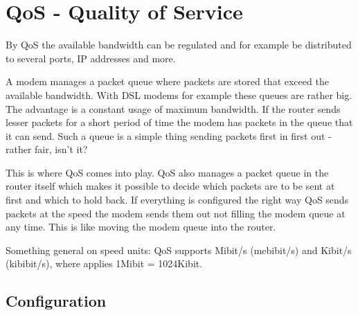 \section{QoS - Quality of Service}

   By QoS the available bandwidth can be regulated and for
   example be distributed to several ports, IP addresses and more.

   A modem manages a packet queue where packets are stored that exceed the
   available bandwidth. With DSL modems for example these queues are
   rather big. The advantage is a constant usage of maximum bandwidth.
   If the router sends lesser packets for a short period of time the
   modem has packets in the queue that it can send. Such a queue is a
   simple thing sending packets first in first out - rather fair, isn't it?

   This is where QoS comes into play. QoS also manages a packet queue
   in the router itself which makes it possible to decide which packets
   are to be sent at first and which to hold back. If everything is
   configured the right way QoS sends packets at the speed the modem sends
   them out not filling the modem queue at any time. This is like moving
   the modem queue into the router.

   Something general on speed units:
   QoS supports Mibit/s (mebibit/s) and Kibit/s (kibibit/s), where applies 1Mibit
   = 1024Kibit.

\subsection{Configuration}

